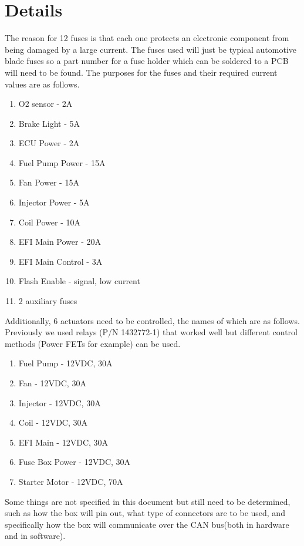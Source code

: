 \documentclass[12pt,letterpaper]{article}
\begin{document}
\section{ Details }
The reason for 12 fuses is that each one protects an electronic component from being damaged by a large current. The fuses used will just be typical automotive blade fuses so a part number for a fuse holder which can be soldered to a PCB will need to be found. The purposes for the fuses and their required current values are as follows.
\begin{enumerate}
    \item O2 sensor - 2A
    \item Brake Light - 5A
    \item ECU Power - 2A
    \item Fuel Pump Power - 15A 
    \item Fan Power - 15A
    \item Injector Power - 5A
    \item Coil Power - 10A
    \item EFI Main Power - 20A
    \item EFI Main Control - 3A
    \item Flash Enable - signal, low current
    \item 2 auxiliary fuses \newline
\end{enumerate} 

\noindent Additionally, 6 actuators need to be controlled, the names of which are as follows. Previously we used relays (P/N 1432772-1) that worked well but different control methods (Power FETs for example) can be used. 
\begin{enumerate}
    \item Fuel Pump - 12VDC, 30A
    \item Fan - 12VDC, 30A
    \item Injector - 12VDC, 30A
    \item Coil - 12VDC, 30A
    \item EFI Main - 12VDC, 30A
    \item Fuse Box Power - 12VDC, 30A
    \item Starter Motor - 12VDC, 70A
\end{enumerate} 

\noindent Some things are not specified in this document but still need to be determined, such as how the box will pin out, what type of connectors are to be used, and specifically how the box will communicate over the CAN bus(both in hardware and in software). 
\end{document}
